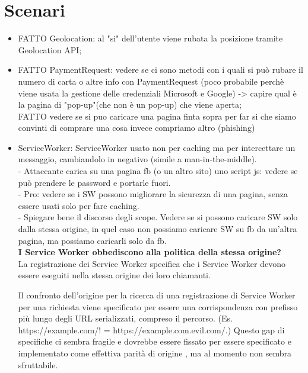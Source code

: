 \documentclass[italian]{article}
\begin{document}
\section{Scenari}
\begin{itemize}
\item FATTO Geolocation: al "si" dell'utente viene rubata la posizione tramite Geolocation API;
\\
\item FATTO PaymentRequest: vedere se ci sono metodi con i quali si può rubare il numero di carta o altre info con PaymentRequest (poco probabile perchè viene usata la gestione delle credenziali Microsoft e Google) -> capire qual è la pagina di "pop-up"(che non è un pop-up) che viene aperta;
\\
FATTO vedere se si puo caricare una pagina finta sopra per far si che siamo convinti di comprare una cosa invece compriamo altro (phishing)
\\
\item ServiceWorker: ServiceWorker usato non per caching ma per intercettare un messaggio, cambiandolo in negativo (simile a man-in-the-middle).
\\
- Attaccante carica su una pagina fb (o un altro sito) uno script js: vedere se può prendere le password e portarle fuori.
\\
- Pro: vedere se i SW possono migliorare la sicurezza di una pagina, senza essere usati solo per fare caching.
\\
- Spiegare bene il discorso degli scope.
Vedere se si possono caricare SW solo dalla stessa origine, in quel caso non possiamo caricare SW su fb da un'altra pagina, ma possiamo caricarli solo da fb.
\\
\textbf{I Service Worker obbediscono alla politica della stessa origine?}
\\
La registrazione dei Service Worker specifica che i Service Worker devono essere eseguiti nella stessa origine dei loro chiamanti.

Il confronto dell'origine per la ricerca di una registrazione di Service Worker per una richiesta viene specificato per essere una corrispondenza con prefisso più lungo degli URL serializzati, compreso il percorso. (Es. https://example.com/! = https://example.com.evil.com/.) 
Questo gap di specifiche ci sembra fragile e dovrebbe essere fissato per essere specificato e implementato come effettiva parità di origine , ma al momento non sembra sfruttabile.


\end{itemize}
\end{document}
